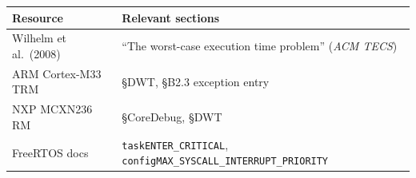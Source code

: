 \documentclass[11pt, a4paper]{article}
\begin{document}
\renewcommand{\arraystretch}{1.3}
\begin{tabular}{@{} p{5.5cm} p{7.5cm} @{}}
  \toprule
  \textbf{Resource} & \textbf{Relevant sections} \\
  \midrule
  Wilhelm et al.\ (2008) &
    ``The worst-case execution time problem'' (\textit{ACM TECS}) \\
  ARM Cortex-M33 TRM & \S DWT, \S B2.3 exception entry \\
  NXP MCXN236 RM & \S CoreDebug, \S DWT \\
  FreeRTOS docs &
    \texttt{taskENTER\_CRITICAL}, \texttt{configMAX\_SYSCALL\_INTERRUPT\_PRIORITY} \\
  \bottomrule
\end{tabular}
\renewcommand{\arraystretch}{1}
\end{document}
